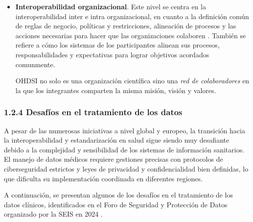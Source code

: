 \begin{itemize}
    \item \textbf{Interoperabilidad organizacional}. Este nivel se centra en la interoperabilidad inter e intra organizacional, en cuanto a la definición común de reglas de negocio, políticas y restricciones, alineación de procesos y las acciones necesarias para hacer que las organizaciones colaboren \cite{motta2019conceptual}. También se refiere a cómo los sistemas de los participantes alinean sus procesos, responsabilidades y expectativas para lograr objetivos acordados comunmente.

    OHDSI no solo es una organización científica sino una \textit{red de colaboradores} en la que los integrantes comparten la misma misión, visión y valores.

\end{itemize}

\subsubsection{1.2.4 Desafíos en el tratamiento de los datos}


A pesar de las numerosas iniciativas a nivel global y europeo, la transición hacia la interoperabilidad y estandarización en salud sigue siendo muy desafiante debido a la complejidad y sensibilidad de los sistemas de información sanitarios. El manejo de datos médicos requiere gestiones precisas con protocolos de ciberseguridad estrictos y leyes de privacidad y confidencialidad bien definidas, lo que dificulta su implementación coordinada en diferentes regiones.

A continuación, se presentan algunos de los desafíos en el tratamiento de los datos clínicos, identificados en el Foro de Seguridad y Protección de Datos organizado por la SEIS en 2024 \cite{SEIS2024tercera, SEIS2024octava}.

